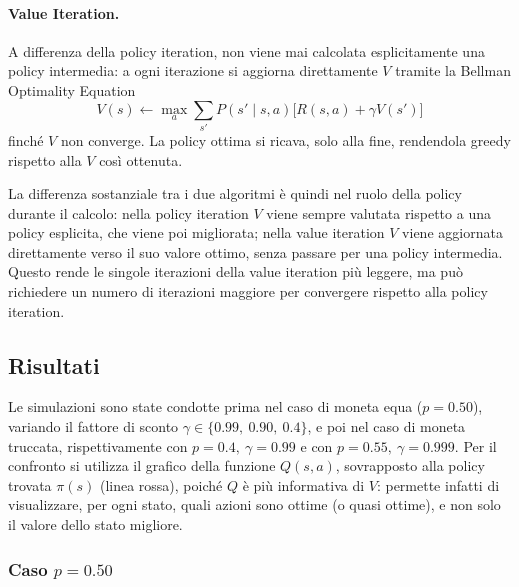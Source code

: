 \paragraph{Value Iteration.} A differenza della policy iteration, non viene mai calcolata esplicitamente una policy intermedia: a ogni iterazione si aggiorna direttamente $V$ tramite la Bellman Optimality Equation
\[
V(s) \leftarrow \max_{a} \sum_{s'} P(s'\mid s,a)\big[R(s,a) + \gamma V(s')\big]
\]
finché $V$ non converge. La policy ottima si ricava, solo alla fine, rendendola greedy rispetto alla $V$ così ottenuta.

La differenza sostanziale tra i due algoritmi è quindi nel ruolo della policy durante il calcolo: nella policy iteration $V$ viene sempre valutata rispetto a una policy esplicita, che viene poi migliorata; nella value iteration $V$ viene aggiornata direttamente verso il suo valore ottimo, senza passare per una policy intermedia. Questo rende le singole iterazioni della value iteration più leggere, ma può richiedere un numero di iterazioni maggiore per convergere rispetto alla policy iteration.

\subsection{Risultati}
Le simulazioni sono state condotte prima nel caso di moneta equa ($p = 0.50$), variando il fattore di sconto $\gamma \in \{0.99,\ 0.90,\ 0.4\}$, e poi nel caso di moneta truccata, rispettivamente con $p = 0.4,\ \gamma = 0.99$ e con $p = 0.55,\ \gamma = 0.999$. Per il confronto si utilizza il grafico della funzione $Q(s,a)$, sovrapposto alla policy trovata $\pi(s)$ (linea rossa), poiché $Q$ è più informativa di $V$: permette infatti di visualizzare, per ogni stato, quali azioni sono ottime (o quasi ottime), e non solo il valore dello stato migliore.

\subsubsection*{Caso $p = 0.50$}

